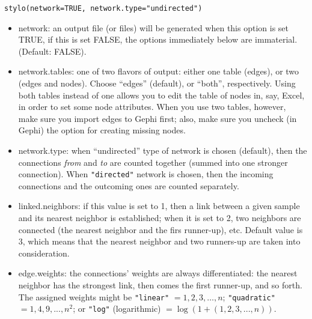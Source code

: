 \documentclass[11pt,a4paper]{article}
\def\margin#1{\marginpar{\textcolor{blue}{\footnotesize\tt #1}}}
\def\code#1{{\tt #1}}
\begin{document}
\medskip
\code{stylo(network=TRUE, network.type="undirected")}


\begin{itemize}

\item network:\margin{network=}\margin{TRUE|FALSE} an output file (or files) will be generated when this option 
is set TRUE, if this is set FALSE, the options immediately below are 
immaterial. (Default: FALSE).

\item network.tables:\margin{network.tables=}\margin{"edges"}\margin{"both"} one of two flavors of output: either one table (edges),  or two (edges and nodes). Choose ``edges'' (default), or ``both'', respectively. Using both tables instead of one allows you to edit the table of nodes in, say, Excel, in order to set some node attributes. When you use two  tables, however, make sure you import edges to Gephi first; also, make sure you uncheck (in Gephi) the option for creating missing nodes.

\item network.type:\margin{network.type=}\margin{"undirected"}\margin{"directed"} when ``undirected'' type of network is chosen (default), then the connections \textit{from} and \textit{to} are counted together (summed into one stronger connection). When \code{"directed"} network is chosen, then the incoming connections and the outcoming ones are counted separately.

\item linked.neighbors:\margin{linked.neighbors=}\margin{<integer>} if this value is set to 1, then a link between a given sample and its nearest neighbor is established; when it is set to 2, two neighbors are connected (the nearest neighbor and the firs runner-up), etc. Default value is 3, which means that the nearest neighbor and two runners-up are taken into consideration.

\item edge.weights:\margin{edge.weights=} the connections' weights are always differentiated: the nearest neighbor has the strongest link, then comes the first runner-up, and so forth.\margin{"linear"}\margin{"quadratic"}\margin{"log"} The assigned weights might be \code{"linear"} $= 1, 2, 3, \dots, n$; \code{"quadratic"} $= 1, 4, 9, ..., n^2$; or \code{"log"} (logarithmic) $= \log(1+(1, 2, 3, ..., n))$.

\end{itemize}
\end{document}
